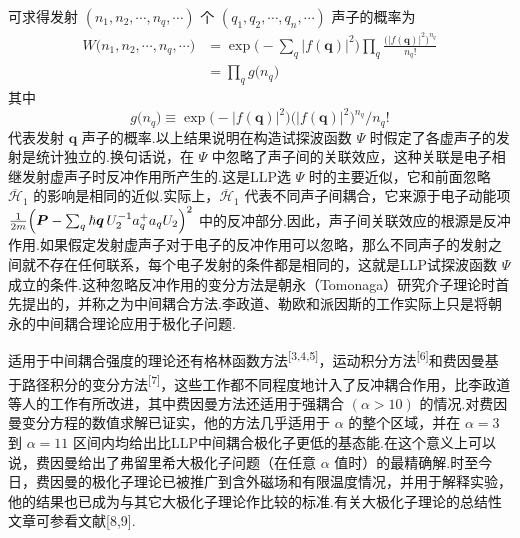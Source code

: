可求得发射 $\left(n_{1},n_{2},\cdots,n_{q},\cdots\right)$ 个
$\left(q_{1},q_{2},\cdots,q_{n},\cdots\right)$ 声子的概率为
\begin{equation}
\begin{aligned}
  W\bigl(n_{1},n_{2},\cdots,n_{q},\cdots\bigr)
  &=\exp\biggl(-\sum_{q}\bigl|f(\boldsymbol{q})\bigr|^{2}\biggr)
  \prod_{q}\frac{\bigl(\bigl|f(\boldsymbol{q})\bigr|^{2}\bigr)^{n_{q}}}{n_{q}!}\\
  &=\prod_{q}g\bigl(n_{q}\bigr)
\end{aligned}
\end{equation}
其中
\begin{equation}
  g\bigl(n_{q}\bigr)\equiv\exp\bigl(-|f(\boldsymbol{q})|^{2}\bigr)
  \bigl(|f(\boldsymbol{q})|^{2}\bigr)^{n_{q}}/n_{q}!
\end{equation}
代表发射 $\boldsymbol{q}$ 声子的概率.以上结果说明在构造试探波函数 $\varPsi$ 时假定了各虚声子的发射是统计独立的.换句话说，在 $\varPsi$ 中忽略了声子间的关联效应，这种关联是电子相继发射虚声子时反冲作用所产生的.这是LLP选 $\varPsi$ 时的主要近似，它和前面忽略 $\overline{\mathscr{H}}_{1}$ 的影响是相同的近似.实际上，$\overline{\mathscr{H}}_{1}$ 代表不同声子间耦合，它来源于电子动能项
$\frac{1}{2m}\Bigl(\boldsymbol{P}-\sum_{q}\hbar\boldsymbol{q}\,
U_{2}^{-1}a_{q}^{+}a_{q}U_{2}\Bigr)^{2}$ 中的反冲部分.因此，声子间关联效应的根源是反冲作用.如果假定发射虚声子对于电子的反冲作用可以忽略，那么不同声子的发射之间就不存在任何联系，每个电子发射的条件都是相同的，这就是LLP试探波函数 $\varPsi$ 成立的条件.这种忽略反冲作用的变分方法是朝永（Tomonaga）研究介子理论时首先提出的，并称之为中间耦合方法.李政道、勒欧和派因斯的工作实际上只是将朝永的中间耦合理论应用于极化子问题.

适用于中间耦合强度的理论还有格林函数方法\textsuperscript{[3,4,5]}，运动积分方法\textsuperscript{[6]}和费因曼基于路径积分的变分方法\textsuperscript{[7]}，这些工作都不同程度地计入了反冲耦合作用，比李政道等人的工作有所改进，其中费因曼方法还适用于强耦合 $\left(\alpha>10\right)$ 的情况.对费因曼变分方程的数值求解已证实，他的方法几乎适用于 $\alpha$ 的整个区域，并在 $\alpha=3$ 到 $\alpha=11$ 区间内均给出比LLP中间耦合极化子更低的基态能.在这个意义上可以说，费因曼给出了弗留里希大极化子问题（在任意 $\alpha$ 值时）的最精确解.时至今日，费因曼的极化子理论已被推广到含外磁场和有限温度情况，并用于解释实验，他的结果也已成为与其它大极化子理论作比较的标准.有关大极化子理论的总结性文章可参看文献[8,9].

